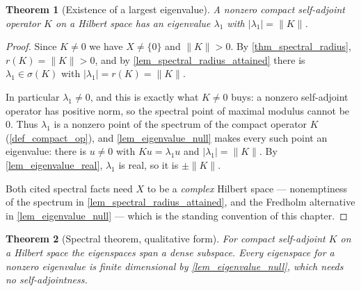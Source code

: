 \documentclass[a4paper]{report}
\theoremstyle{plain}
\newtheorem{theorem}{Theorem}[chapter]
\theoremstyle{definition}
\theoremstyle{remark}
\begin{document}
\begin{theorem}[Existence of a largest eigenvalue]
  \label{thm_max_eigenvalue}
  A nonzero compact self-adjoint operator $K$ on a Hilbert space has an eigenvalue
  $\lambda_1$ with $|\lambda_1| = \|K\|$.
\end{theorem}
\begin{proof}
  Since $K \ne 0$ we have $X \ne \{0\}$ and $\|K\| > 0$.  By \cref{thm_spectral_radius},
  $r(K) = \|K\| > 0$, and by \cref{lem_spectral_radius_attained} there is
  $\lambda_1 \in \sigma(K)$ with $|\lambda_1| = r(K) = \|K\|$.

  In particular $\lambda_1 \ne 0$, and this is exactly what $K \ne 0$ buys: a nonzero
  self-adjoint operator has positive norm, so the spectral point of maximal modulus cannot
  be $0$.  Thus $\lambda_1$ is a nonzero point of the spectrum of the compact operator $K$
  (\cref{def_compact_op}), and \cref{lem_eigenvalue_null} makes every such point an
  eigenvalue: there is $u \ne 0$ with $Ku = \lambda_1u$ and $|\lambda_1| = \|K\|$.  By
  \cref{lem_eigenvalue_real}, $\lambda_1$ is real, so it is $\pm\|K\|$.

  Both cited spectral facts need $X$ to be a \emph{complex} Hilbert space --- nonemptiness
  of the spectrum in \cref{lem_spectral_radius_attained}, and the Fredholm alternative in
  \cref{lem_eigenvalue_null} --- which is the standing convention of this chapter.
\end{proof}


\begin{theorem}[Spectral theorem, qualitative form]
  \label{thm_spectral_qualitative}
  For compact self-adjoint $K$ on a Hilbert space the eigenspaces span a dense
  subspace.  Every eigenspace for a nonzero eigenvalue is finite dimensional by
  \cref{lem_eigenvalue_null}, which needs no self-adjointness.
\end{theorem}
\end{document}
